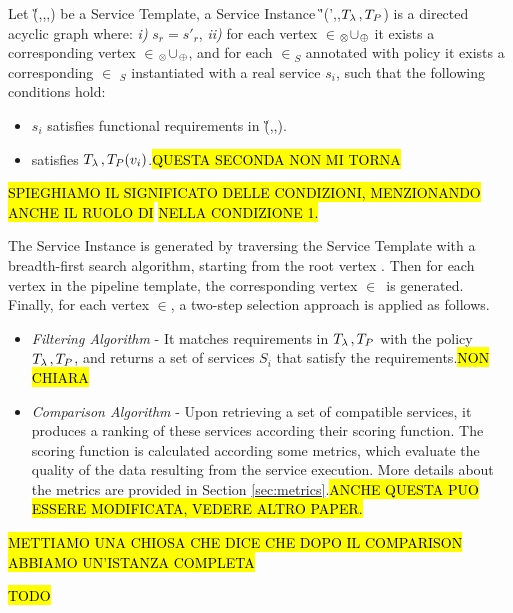 \begin{definition}\label{def:instance}
Let \G(\V,\E,\myLambda,\myGamma) be a Service Template, a Service Instance \G'(\V',\E,$T_{\lambda\,{}},T_P$) is a directed acyclic graph where:
\emph{i)} $s_r$$=$$s'_r$, \emph{ii)} for each vertex \vi{}$\in$\V$_{\otimes}$$\cup$\V$_{\oplus}$ it exists a corresponding vertex \vii{}$\in$\Vp$_{\otimes}$$\cup$\Vp$_{\oplus}$,
    and for each $\in$\V$_S$ annotated with policy  it exists a corresponding $\in$ \Vp$_S$ instantiated with a real service $s_i$, such that the following conditions hold:
    \begin{itemize}
      \item $s_i$ satisfies functional requirements in \G(\Vp,\E,\iChartFunction).
      \item {} satisfies $T_{\lambda\,{}},T_P(v_i)$.\hl{QUESTA SECONDA NON MI TORNA}
    \end{itemize}
\end{definition}

\hl{SPIEGHIAMO IL SIGNIFICATO DELLE CONDIZIONI, MENZIONANDO ANCHE IL RUOLO DI}\F{}\hl{ NELLA CONDIZIONE 1.}

The Service  Instance  is generated by traversing the Service Template with a breadth-first search algorithm, starting from the root vertex . Then for each vertex  in the pipeline template, the corresponding vertex $\in$\Vp\ is generated. Finally, for each vertex $\in$\Vp, a two-step selection approach is applied as follows.
\begin{itemize}
  \item \textit{Filtering Algorithm} - It matches requirements in $T_{\lambda\,{}},T_P$ with the policy $T_{\lambda\,{}},T_P$, and returns a set of services $S_i$ that satisfy the requirements.\hl{NON CHIARA}
  \item \textit{Comparison Algorithm} - Upon retrieving a set of compatible services, it produces a ranking of these services according their scoring function. The scoring function is calculated according some metrics, which evaluate the quality of the data resulting from the service execution. More details about the metrics are provided in Section \ref{sec:metrics}.\hl{ANCHE QUESTA PUO ESSERE MODIFICATA, VEDERE ALTRO PAPER.}
\end{itemize}

\hl{METTIAMO UNA CHIOSA CHE DICE CHE DOPO IL COMPARISON ABBIAMO UN'ISTANZA COMPLETA}

\begin{example}
  \hl{TODO}
\end{example}


